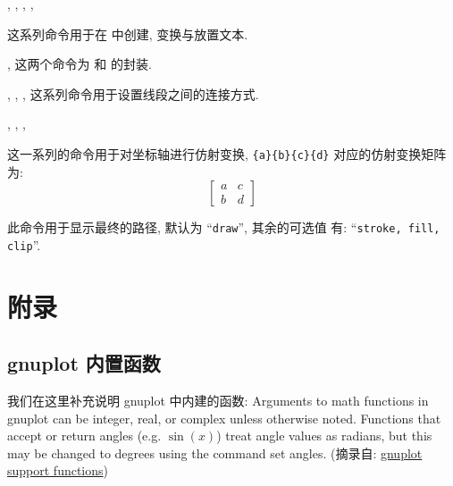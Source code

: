 \documentclass[
  hyper, 
  lang = cn, 
  class = l3doc,
  classOption={11pt},
  sect = {load=false},
]{../../zlatex/code/ztex}
\begin{document}
\begin{function}[added=2025-05-15]{\znewtext, \zsethtext, \zsetvtext, \zscaletext, \zputtext}
  \begin{syntax}
  \end{syntax}
  这系列命令用于在  中创建, 变换与放置文本.
\end{function}


\begin{function}[added=2025-05-15]{\zbg, \zeg}
  这两个命令为  和  的封装.
\end{function}



\begin{function}[added=2025-05-15]{\zcapbutt, \zcaproun, \zcaprect, \zclosepath}
  这系列命令用于设置线段之间的连接方式.
\end{function}


\begin{function}[added=2025-05-15]{\zshift, \zxscale, \zyscale, \ztrans}
  \begin{syntax}
  \end{syntax}
  这一系列的命令用于对坐标轴进行仿射变换, \verb|{a}{b}{c}{d}| 对应的仿射变换矩阵为:
  \[\begin{bmatrix}
    a & c\\
    b & d
  \end{bmatrix}\]
\end{function}


\begin{function}[added=2025-05-15]{\zusepath}
  \begin{syntax}
  \end{syntax}
  此命令用于显示最终的路径,  默认为 ``\texttt{draw}'', 其余的可选值
  有: ``\texttt{stroke, fill, clip}''.
\end{function}


\clearpage
\section{附录}
\subsection{gnuplot 内置函数}
我们在这里补充说明 gnuplot 中内建的函数: Arguments to math functions in gnuplot can be integer, real, or 
complex unless otherwise noted. Functions that accept or return angles (e.g. $\sin(x)$) treat angle values as radians, 
but this may be changed to degrees using the command set angles.
(摘录自: \href{http://www.bersch.net/gnuplot-doc/expressions.html#expressions-functions-floor}{gnuplot support functions})
\end{document}
